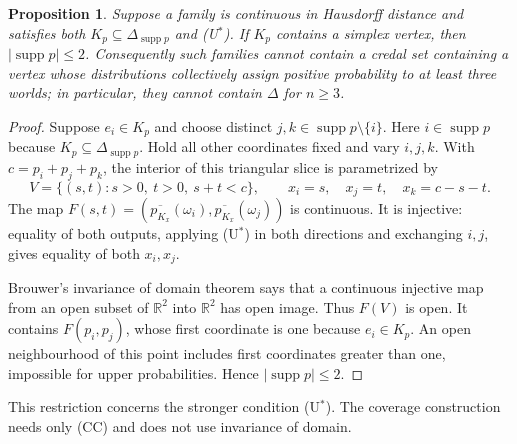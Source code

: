 \documentclass[11pt]{article}
\newtheorem{proposition}[theorem]{Proposition}
\theoremstyle{remark}
\newcommand{\R}{\mathbb R}
\newcommand{\supp}{\operatorname{supp}}
\newcommand{\upprob}[1]{\overline{p_{#1}}}
\begin{document}
\begin{proposition}\label{prop:ustar}
Suppose a family is continuous in Hausdorff distance and satisfies both
$K_p\subseteq\Delta_{\supp p}$ and (U$^*$).
If $K_p$ contains a simplex vertex, then $|\supp p|\le2$. Consequently such
families cannot contain a credal set containing a vertex whose distributions collectively assign positive probability
to at least three worlds; in particular, they cannot contain $\Delta$ for
$n\ge3$.
\end{proposition}
\begin{proof}
Suppose $e_i\in K_p$ and choose distinct $j,k\in\supp p\setminus\{i\}$.
Here $i\in\supp p$ because $K_p\subseteq\Delta_{\supp p}$. Hold all other coordinates fixed and
vary $i,j,k$. With $c=p_i+p_j+p_k$, the interior of this triangular slice is
parametrized by
\[
 V=\{(s,t):s>0,\ t>0,\ s+t<c\},\qquad
 x_i=s,\quad x_j=t,\quad x_k=c-s-t.
\]
The map $F(s,t)=(\upprob{K_x}(\omega_i),\upprob{K_x}(\omega_j))$ is continuous. It is injective:
equality of both outputs, applying (U$^*$) in both directions and exchanging
$i,j$, gives equality of both $x_i,x_j$.

Brouwer's invariance of domain theorem says that a continuous injective map
from an open subset of $\R^2$ into $\R^2$ has open image. Thus $F(V)$ is open.
It contains $F(p_i,p_j)$, whose first coordinate is one because $e_i\in K_p$.
An open neighbourhood of this point includes first coordinates greater than
one, impossible for upper probabilities. Hence $|\supp p|\le2$.
\end{proof}

This restriction concerns the stronger condition (U$^*$).
The coverage construction needs only (CC) and does not use invariance of domain.
\end{document}
